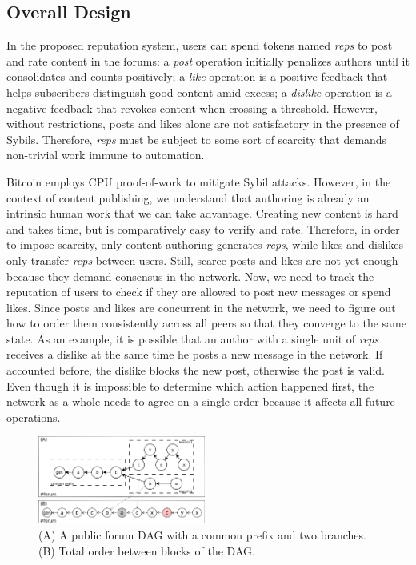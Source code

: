 \documentclass[10pt,journal,compsoc]{IEEEtran}
\newcommand{\reps}     {\emph{reps}\xspace}
\begin{document}
\subsection{Overall Design}
\label{sec.consensus.design}

In the proposed reputation system, users can spend tokens named \reps to post
and rate content in the forums:
a \emph{post} operation initially penalizes authors until it consolidates and
counts positively;
a \emph{like} operation is a positive feedback that helps subscribers
distinguish good content amid excess;
a \emph{dislike} operation is a negative feedback that revokes content when
crossing a threshold.
%
However, without restrictions, posts and likes alone are not satisfactory in
the presence of Sybils.
Therefore, \reps must be subject to some sort of scarcity that demands
non-trivial work immune to automation.

Bitcoin employs CPU proof-of-work to mitigate Sybil attacks.
However, in the context of content publishing, we understand that authoring is
already an intrinsic human work that we can take advantage.
Creating new content is hard and takes time, but is comparatively easy to
verify and rate.
Therefore, in order to impose scarcity, only content authoring generates \reps,
while likes and dislikes only transfer \reps between users.
%
Still, scarce posts and likes are not yet enough because they demand consensus
in the network.
Now, we need to track the reputation of users to check if they are allowed to
post new messages or spend likes.
Since posts and likes are concurrent in the network, we need to figure out how
to order them consistently across all peers so that they converge to the same
state.
As an example, it is possible that an author with a single unit of \reps
receives a dislike at the same time he posts a new message in the network.
If accounted before, the dislike blocks the new post, otherwise the post is
valid.
Even though it is impossible to determine which action happened first, the
network as a whole needs to agree on a single order because it affects all
future operations.

\begin{figure}[t]
\centering
\includegraphics[width=0.49\textwidth]{reps2.png}
\caption{
    (A) A public forum DAG with a common prefix and two branches.
    (B) Total order between blocks of the DAG.
}
\label{fig.reps}
\end{figure}
\end{document}
